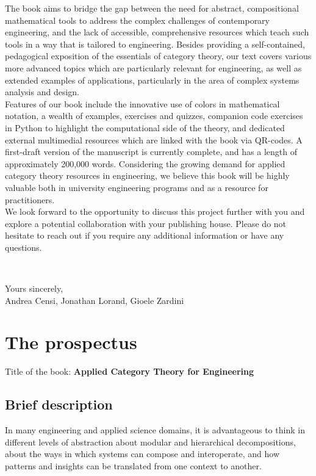 \documentclass[10pt, article, one side]{memoir}
\begin{document}
    The book aims to bridge the gap between the need for abstract, compositional mathematical tools to address the complex challenges of contemporary engineering, and the lack of accessible, comprehensive resources which teach such tools in a way that is tailored to engineering.
    Besides providing a self-contained, pedagogical exposition of the essentials of category theory, our text covers various more advanced topics which are particularly relevant for engineering, as well as extended examples of applications, particularly in the area of complex systems analysis and design.
    \\[-7pt]

    Features of our book include the innovative use of colors in mathematical notation, a wealth of examples, exercises and quizzes, companion code exercises in Python to highlight the computational side of the theory, and dedicated external multimedial resources which are linked with the book via QR-codes.
    A first-draft version of the manuscript is currently complete, and has a length of approximately 200,000 words.
    Considering the growing demand for applied category theory resources in engineering, we believe this book will be highly valuable both in university engineering programs and as a resource for practitioners.
    \\[-7pt]

    We look forward to the opportunity to discuss this project further with you and explore a potential collaboration with your publishing house.
    Please do not hesitate to reach out if you require any additional information or have any questions.

    \

    \noindent Yours sincerely,\\

    \noindent \hspace{8cm}
    Andrea Censi, Jonathan Lorand, Gioele Zardini

    \newpage

    \chapter{The prospectus}
    Title of the book: \textbf{Applied Category Theory for Engineering}
    \section{Brief description}
    In many engineering and applied science domains, it is advantageous to think in different levels of abstraction about modular and hierarchical decompositions, about the ways in which systems can compose and interoperate, and how patterns and insights can be translated from one context to another. 
   
\end{document}
